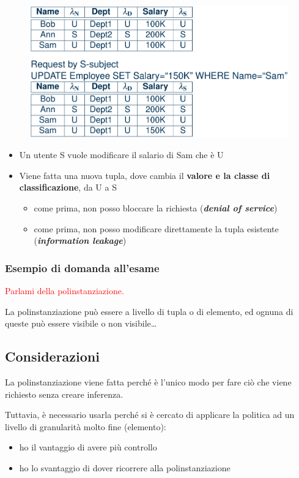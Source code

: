 \documentclass{report}
\begin{document}
\begin{figure}[H]
    \centering
    \includegraphics[width=0.8\linewidth]{images/poly4.png}
\end{figure}

\begin{itemize}
    \item Un utente S vuole modificare il salario di Sam che è U 
    \item Viene fatta una nuova tupla, dove cambia il \textbf{valore e la classe di classificazione}, da 
    U a S 
    \begin{itemize}
        \item come prima, non posso bloccare la richiesta (\textit{\textbf{denial of service}})
        \item come prima, non posso modificare direttamente la tupla esistente (\textit{\textbf{information leakage}})
    \end{itemize}
\end{itemize}

\subsubsection{Esempio di domanda all'esame}
\textcolor{red}{Parlami della polinstanziazione.} 

\noindent La polinstanziazione può essere a livello di tupla o di elemento, ed ognuna di queste 
può essere visibile o non visibile\dots

\subsection{Considerazioni}
La polinstanziazione viene fatta perché è l'unico modo per fare ciò che viene richiesto 
senza creare inferenza. 

\noindent Tuttavia, è necessario usarla perché si è cercato di applicare la politica ad un 
livello di granularità molto fine (elemento):
\begin{itemize}
    \item ho il vantaggio di avere più controllo 
    \item ho lo svantaggio di dover ricorrere alla polinstanziazione
\end{itemize}
\end{document}
